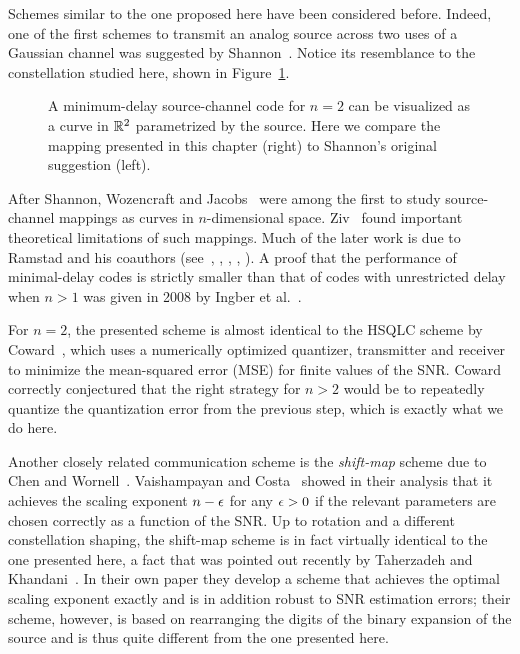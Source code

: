 Schemes similar to the one proposed here have been considered before. Indeed,
one of the first schemes to transmit an analog source across two uses of a
Gaussian channel was suggested by Shannon~\cite{Shannon1949}. Notice its
resemblance to the constellation studied here, shown in
Figure~\ref{fig:shannoncomparison}.
\begin{figure}
  \centerline{
  \hfil
  \subfloat[Mapping proposed in this paper
  (for~$n=2$).]{} }%
  \caption{A minimum-delay source-channel code for $n=2$ can be visualized as a
  curve in $\mathbb{R}^2$ parametrized by the source. Here we compare the mapping
  presented in this chapter (right) to Shannon's original suggestion (left).}
  \label{fig:shannoncomparison}
\end{figure}

After Shannon, Wozencraft and Jacobs~\cite{WozencraftJ1965} were among the first
to study source-channel mappings as curves in $n$-dimensional space.
Ziv~\cite{Ziv1970} found important theoretical limitations of such mappings.
Much of the later work is due to Ramstad and his coauthors
(see~\cite{Ramstad2002}, \cite{FloorR2006}, \cite{CowardR2000,CowardR2000a},
\cite{WernerssonSR2007}, \cite{HeklandFR2009}). A proof that the performance of
minimal-delay codes is strictly smaller than that of codes with unrestricted
delay when $n>1$ was given in 2008 by Ingber et al.~\cite{IngberLZF2008}.

For $n=2$, the presented scheme is almost identical to the HSQLC scheme by
Coward~\cite{Coward2001}, which uses a numerically optimized quantizer,
transmitter and receiver to minimize the mean-squared error (MSE) for finite
values of the SNR. Coward correctly conjectured that the right strategy for $n >
2$ would be to repeatedly quantize the quantization error from the previous
step, which is exactly what we do here.

Another closely related communication scheme is the \emph{shift-map} scheme due
to Chen and Wornell~\cite{ChenW1998}.  Vaishampayan and
Costa~\cite{VaishampayanC2003} showed in their analysis that it achieves the
scaling exponent $n-\epsilon$ for any $\epsilon > 0$ if the relevant parameters are chosen
correctly as a function of the SNR. Up to rotation and a different constellation
shaping, the shift-map scheme is in fact virtually identical to the one
presented here, a fact that was pointed out recently by Taherzadeh and
Khandani~\cite{TaherzadehK2008}. In their own paper they develop a scheme that
achieves the optimal scaling exponent exactly and is in addition robust to SNR
estimation errors; their scheme, however, is based on rearranging the digits of
the binary expansion of the source and is thus quite different from the one
presented here.

